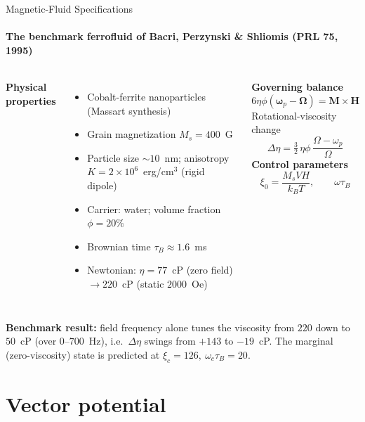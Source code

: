 \documentclass[aspectratio=43,10pt]{beamer}
\begin{document}
\begin{frame}{Magnetic-Fluid Specifications}
  \framesubtitle{The benchmark ferrofluid of Bacri, Perzynski \& Shliomis (PRL 75, 1995)}
  \small
  \begin{columns}[T]
      \textbf{Physical properties}
      \begin{itemize}
        \item Cobalt-ferrite nanoparticles (Massart synthesis)
        \item Grain magnetization $M_s = 400$~G
        \item Particle size $\sim 10$~nm; anisotropy $K = 2\times10^{6}$~erg/cm$^3$ (rigid dipole)
        \item Carrier: water; volume fraction $\phi = 20\%$
        \item Brownian time $\tau_B \approx 1.6$~ms
        \item Newtonian: $\eta = 77$~cP (zero field) $\to 220$~cP (static $2000$~Oe)
      \end{itemize}
      \textbf{Governing balance}
      \[ 6\eta\phi(\bm\omega_p-\bm\Omega)=\bm M\times\bm H \]
      Rotational-viscosity change
      \[ \Delta\eta=\tfrac{3}{2}\,\eta\phi\,\frac{\Omega-\omega_p}{\Omega} \]
      \textbf{Control parameters}
      \[ \xi_0=\frac{M_s V H}{k_BT},\qquad \omega\tau_B \]
  \end{columns}
  \vspace{0.15cm}
  \textbf{Benchmark result:} field frequency alone tunes the viscosity from $220$ down to $50$~cP (over $0$--$700$~Hz), i.e.\ $\Delta\eta$ swings from $+143$ to $-19$~cP. The marginal (zero-viscosity) state is predicted at $\xi_c=126,\ \omega_c\tau_B=20$.
\end{frame}

\section{Vector potential}
\end{document}
